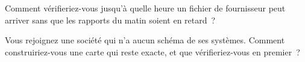 \begin{interviewq}\label{iq:pl:the-platform-map:5}
Comment vérifieriez-vous jusqu'à quelle heure un fichier de fournisseur peut arriver sans que les rapports du matin soient en retard~?
\end{interviewq}

\begin{interviewq}\label{iq:pl:the-platform-map:6}
Vous rejoignez une société qui n'a aucun schéma de ses systèmes. Comment construiriez-vous une carte qui reste exacte, et que vérifieriez-vous en premier~?
\end{interviewq}
